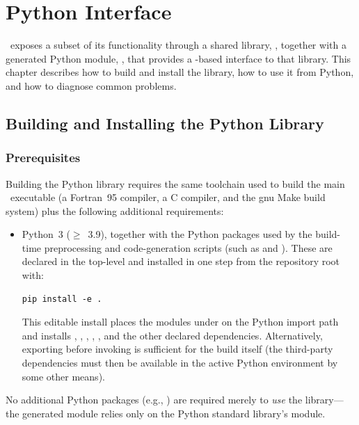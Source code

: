 \chapter{Python Interface}\label{sec:pythonInterface}

\glc\ exposes a subset of its functionality through a shared library, , together with a generated Python module, , that provides a -based interface to that library. This chapter describes how to build and install the library, how to use it from Python, and how to diagnose common problems.

\section{Building and Installing the Python Library}\label{sec:pythonInterface:build}

\subsection{Prerequisites}\label{sec:pythonInterface:build:prerequisites}

Building the Python library requires the same toolchain used to build the main \glc\ executable (a Fortran~95 compiler, a C compiler, and the \gls{gnu} Make build system) plus the following additional requirements:
\begin{itemize}
  \item Python~3 ($\geq$~3.9), together with the Python packages used by the build-time preprocessing and code-generation scripts (such as  and ).  These are declared in the top-level  and installed in one step from the repository root with:
\begin{verbatim}
pip install -e .
\end{verbatim}
  This editable install places the modules under  on the Python import path and installs , , , , , and the other declared dependencies.  Alternatively, exporting  before invoking  is sufficient for the build itself (the third-party dependencies must then be available in the active Python environment by some other means).
\end{itemize}

No additional Python packages (e.g., ) are required merely to \emph{use} the library---the generated module relies only on the Python standard library's  module.

